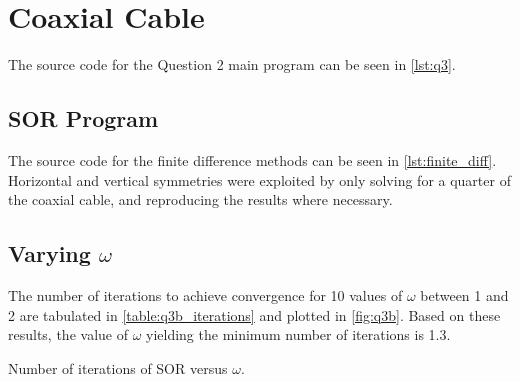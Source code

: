 \documentclass[a4paper,titlepage]{article}
\begin{document}
	\section{Coaxial Cable}
	
	The source code for the Question 2 main program can be seen in \autoref{lst:q3}.
	
	\subsection{SOR Program}
	
	The source code for the finite difference methods can be seen in \autoref{lst:finite_diff}. Horizontal and vertical symmetries were exploited by only solving for a quarter of the coaxial cable, and reproducing the results where necessary.
	
	\subsection{Varying $\omega$}
	
	The number of iterations to achieve convergence for 10 values of $\omega$ between 1 and 2 are tabulated in \autoref{table:q3b_iterations} and plotted in \autoref{fig:q3b}. Based on these results, the value of $\omega$ yielding the minimum number of iterations is 1.3.
	
	\begin{table}[!htb]
		\centering
		\caption{Number of iterations of SOR versus $\omega$.}
		\label{table:q3b_iterations}
	\end{table}
	
\end{document}
